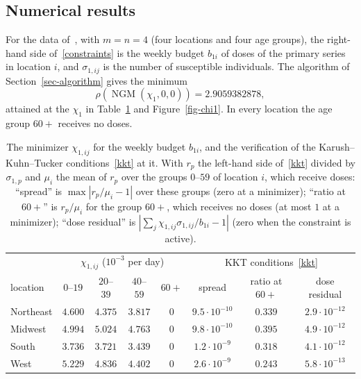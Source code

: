 \documentclass[11pt]{article}
\theoremstyle{plain}
\theoremstyle{definition}
\theoremstyle{remark}
\numberwithin{equation}{section}
\numberwithin{figure}{section}
\numberwithin{table}{section}
\begin{document}
\subsection{Numerical results}\label{sec-numerics}

For the data of~\cite{JZh}, with $m=n=4$ (four locations and four age groups),
the right-hand side of~\eqref{constraints} is the weekly budget $b_{1i}$ of
doses of the primary series in location $i$, and $\sigma_{1,ij}$ is the number
of susceptible individuals. The algorithm of Section~\ref{sec-algorithm} gives
the minimum
\begin{equation}
\rho\left(\operatorname{NGM}(\chi_1,0,0)\right)=2.9059382878,
\end{equation}
attained at the $\chi_1$ in Table~\ref{tab-chi1} and Figure~\ref{fig-chi1}. In
every location the age group $60+$ receives no doses.

\begin{table}[ht]
\centering
\small
\begin{tabular}{lcccc|ccc}
\hline
 & \multicolumn{4}{c|}{$\chi_{1,ij}$ ($10^{-3}$ per day)} & \multicolumn{3}{c}{KKT conditions~\eqref{kkt}}\\
location & $0$--$19$ & $20$--$39$ & $40$--$59$ & $60+$ & spread & ratio at $60+$ & dose residual\\
\hline
Northeast & $4.600$ & $4.375$ & $3.817$ & $0$ & $9.5\cdot 10^{-10}$ & $0.339$ & $2.9\cdot 10^{-12}$\\
Midwest   & $4.994$ & $5.024$ & $4.763$ & $0$ & $9.8\cdot 10^{-10}$ & $0.395$ & $4.9\cdot 10^{-12}$\\
South     & $3.736$ & $3.721$ & $3.439$ & $0$ & $1.2\cdot 10^{-9}$  & $0.318$ & $4.1\cdot 10^{-12}$\\
West      & $5.229$ & $4.836$ & $4.402$ & $0$ & $2.6\cdot 10^{-9}$  & $0.243$ & $5.8\cdot 10^{-13}$\\
\hline
\end{tabular}
\caption{The minimizer $\chi_{1,ij}$ for the weekly budget $b_{1i}$, and the
verification of the Karush--Kuhn--Tucker conditions~\eqref{kkt} at it. With
$r_p$ the left-hand side of~\eqref{kkt} divided by $\sigma_{1,p}$ and
$\mu_i$ the mean of $r_p$ over the groups $0$--$59$ of location $i$, which
receive doses: ``spread'' is $\max\left|r_p/\mu_i-1\right|$ over these groups
(zero at a minimizer); ``ratio at $60+$'' is $r_p/\mu_i$ for the group $60+$,
which receives no doses (at most $1$ at a minimizer); ``dose residual'' is
$\left|\sum_j\chi_{1,ij}\sigma_{1,ij}/b_{1i}-1\right|$ (zero when the
constraint is active).}\label{tab-chi1}
\end{table}
\end{document}
